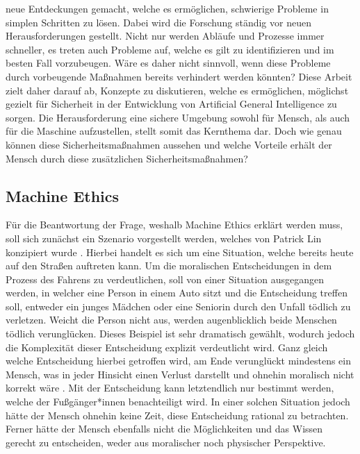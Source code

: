             neue Entdeckungen gemacht, welche es ermöglichen, schwierige Probleme in simplen Schritten zu lösen.
            Dabei wird die Forschung ständig vor neuen Herausforderungen gestellt. Nicht nur werden Abläufe und Prozesse
            immer schneller, es treten auch Probleme auf, welche es gilt zu identifizieren und im besten Fall vorzubeugen.
            Wäre es daher nicht sinnvoll, wenn diese Probleme durch vorbeugende Maßnahmen bereits verhindert werden könnten?
            Diese Arbeit zielt daher darauf ab, Konzepte zu diskutieren, welche es ermöglichen, möglichst gezielt für
            Sicherheit in der Entwicklung von Artificial General Intelligence zu sorgen. Die Herausforderung eine sichere
            Umgebung sowohl für Mensch, als auch für die Maschine aufzustellen, stellt somit das Kernthema dar. Doch wie
            genau können diese Sicherheitsmaßnahmen aussehen und welche Vorteile erhält der Mensch durch diese zusätzlichen
            Sicherheitsmaßnahmen?

        \subsection{Machine Ethics}
            Für die Beantwortung der Frage, weshalb Machine Ethics erklärt werden muss, soll sich zunächst ein Szenario
            vorgestellt werden, welches von Patrick Lin konzipiert wurde \cite[s. 70]{maurer_gerdes_lenz_winner_2015}.
            Hierbei handelt es sich um eine Situation, welche bereits heute auf den Straßen auftreten kann. Um die
            moralischen Entscheidungen in dem Prozess des Fahrens zu verdeutlichen, soll von einer Situation ausgegangen
            werden, in welcher eine Person in einem Auto sitzt und die Entscheidung treffen soll, entweder ein junges
            Mädchen oder eine Seniorin durch den Unfall tödlich zu verletzen. Weicht die Person nicht aus, werden augenblicklich
            beide Menschen tödlich verunglücken. Dieses Beispiel ist sehr dramatisch gewählt, wodurch jedoch die Komplexität
            dieser Entscheidung explizit verdeutlicht wird. Ganz gleich welche Entscheidung hierbei getroffen wird, am
            Ende verunglückt mindestens ein Mensch, was in jeder Hinsicht einen Verlust darstellt und ohnehin moralisch
            nicht korrekt wäre \cite[s. 70]{maurer_gerdes_lenz_winner_2015}. Mit der Entscheidung kann letztendlich nur
            bestimmt werden, welche der Fußgänger*innen benachteiligt wird. In einer solchen Situation jedoch hätte der
            Mensch ohnehin keine Zeit, diese Entscheidung rational zu betrachten. Ferner hätte der Mensch ebenfalls nicht
            die Möglichkeiten und das Wissen gerecht zu entscheiden, weder aus moralischer noch physischer Perspektive.

